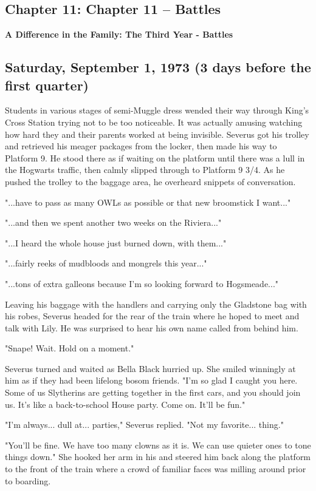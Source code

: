 \documentclass[a4paper,11pt]{article}
\begin{document}
\subsection{Chapter 11: Chapter 11 – Battles}

\textbf{A Difference in the Family: The Third Year - Battles}

\subsection{Saturday, September 1, 1973 (3 days before the first quarter)}

Students in various stages of semi-Muggle dress wended their way through King's Cross Station trying not to be too noticeable. It was actually amusing watching how hard they and their parents worked at being invisible. Severus got his trolley and retrieved his meager packages from the locker, then made his way to Platform 9. He stood there as if waiting on the platform until there was a lull in the Hogwarts traffic, then calmly slipped through to Platform 9 3/4. As he pushed the trolley to the baggage area, he overheard snippets of conversation.

"...have to pass as many OWLs as possible or that new broomstick I want..."

"...and then we spent another two weeks on the Riviera..."

"...I heard the whole house just burned down, with them..."

"...fairly reeks of mudbloods and mongrels this year..."

"...tons of extra galleons because I'm so looking forward to Hogsmeade..."

Leaving his baggage with the handlers and carrying only the Gladstone bag with his robes, Severus headed for the rear of the train where he hoped to meet and talk with Lily. He was surprised to hear his own name called from behind him.

"Snape! Wait. Hold on a moment."

Severus turned and waited as Bella Black hurried up. She smiled winningly at him as if they had been lifelong bosom friends. "I'm so glad I caught you here. Some of us Slytherins are getting together in the first cars, and you should join us. It's like a back-to-school House party. Come on. It'll be fun."

"I'm always... dull at... parties," Severus replied. "Not my favorite... thing."

"You'll be fine. We have too many clowns as it is. We can use quieter ones to tone things down." She hooked her arm in his and steered him back along the platform to the front of the train where a crowd of familiar faces was milling around prior to boarding.
\end{document}
